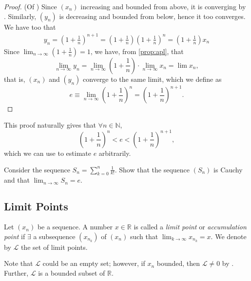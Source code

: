 \documentclass[12pt]{article}
\begin{document}
\begin{proof}(Of )
  Since $(x_n)$ increasing and bounded from above, it is converging by . Similarly, $(y_n)$ is decreasing and bounded from below, hence it too converges. We have too that \begin{align*}
    y_n = \left(1+\frac{1}{n}\right)^{n+1} = \left(1 + \frac{1}{n}\right)\left(1 + \frac{1}{n}\right)^n = \left(1 + \frac{1}{n}\right) x_n
  \end{align*}
  Since $\lim_{n\to\infty} \left(1 + \frac{1}{n}\right) = 1$, we have, from \cref{prop:apl}, that \[
  \lim_{n\to\infty} y_n = \lim_{n\to\infty} \left(1 + \frac{1}{n}\right) \cdot \lim_{n\to\infty} x_n = \lim x_n,  
  \]
  that is, $(x_n)$ and $(y_n)$ converge to the same limit, which we define as \[
  e \equiv \lim_{n\to\infty} \left(1 + \frac{1}{n}\right)^n = \left(1 + \frac{1}{n}\right)^{n+1}.  
  \]
\end{proof}

\begin{remark}
  This proof naturally gives that $\forall n \in \mathbb{N}$, \[\left(1 + \frac{1}{n}\right)^n < e < \left(1 + \frac{1}{n}\right)^{n+1},\] which we can use to estimate $e$ arbitrarily.
\end{remark}

\begin{example}
  Consider the sequence $S_n = \sum_{k=0}^{n} \frac{1}{k!}$. Show that the sequence $(S_n)$ is Cauchy and that $\lim_{n\to\infty} S_n = e$.
\end{example}


\subsection{Limit Points}
\begin{definition}
  Let $(x_n)$ be a sequence. A number $x \in \mathbb{R}$ is called a \emph{limit point} or \emph{accumulation point} if $\exists$ a subsequence $(x_{n_k})$ of $(x_n)$ such that $\lim_{k\to\infty} x_{n_k} = x$. We denote by $\mathscr{L}$ the set of limit points.
\end{definition}

\begin{remark}
  Note that $\mathscr{L}$ could be an empty set; however, if $x_n$ bounded, then $\mathscr{L} \neq 0$ by . Further, $\mathscr{L}$ is a bounded subset of $\mathbb{R}$.
\end{remark}
\end{document}

